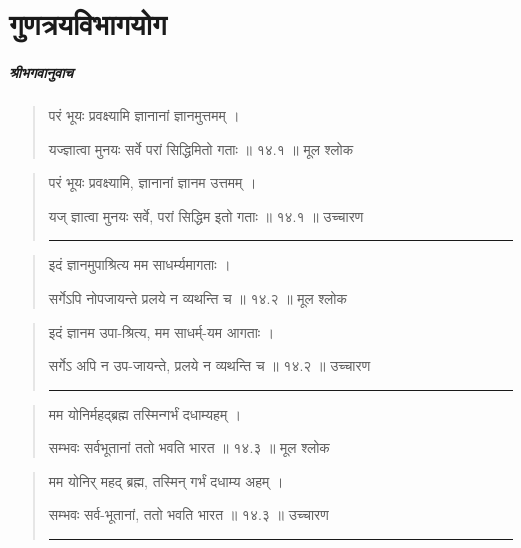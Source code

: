 \chapter{\sanskrit गुणत्रयविभागयोग} 
\paragraph{\sanskrit श्रीभगवानुवाच}
\begin{quotation} 
परं भूयः प्रवक्ष्यामि ज्ञानानां ज्ञानमुत्तमम् ।  

यज्ज्ञात्वा मुनयः सर्वे परां सिद्धिमितो गताः   ॥ १४.१ ॥  मूल श्लोक
\end{quotation}

\begin{quotation}

परं भूयः प्रवक्ष्यामि, ज्ञानानां ज्ञानम उत्तमम् ।  

यज् ज्ञात्वा मुनयः सर्वे, परां सिद्धिम इतो गताः  ॥ १४.१ ॥  उच्चारण

\noindent\rule{16cm}{0.4pt} 
\end{quotation}


\begin{quotation}

इदं ज्ञानमुपाश्रित्य मम साधर्म्यमागताः  ।  

सर्गेऽपि नोपजायन्ते प्रलये न व्यथन्ति च   ॥ १४.२ ॥  मूल श्लोक
\end{quotation}

\begin{quotation}

इदं ज्ञानम उपा-श्रित्य, मम साधर्म्-यम आगताः  ।  

सर्गेऽ अपि न उप-जायन्ते, प्रलये न व्यथन्ति च  ॥ १४.२ ॥  उच्चारण

\noindent\rule{16cm}{0.4pt} 
\end{quotation}


\begin{quotation}

मम योनिर्महद्ब्रह्म तस्मिन्गर्भं दधाम्यहम्‌  ।  

सम्भवः सर्वभूतानां ततो भवति भारत  ॥ १४.३ ॥  मूल श्लोक
\end{quotation}

\begin{quotation}

मम योनिर् महद् ब्रह्म, तस्मिन् गर्भं दधाम्य अहम्‌  ।  

सम्भवः सर्व-भूतानां, ततो भवति भारत  ॥ १४.३ ॥  उच्चारण

\noindent\rule{16cm}{0.4pt} 
\end{quotation}


